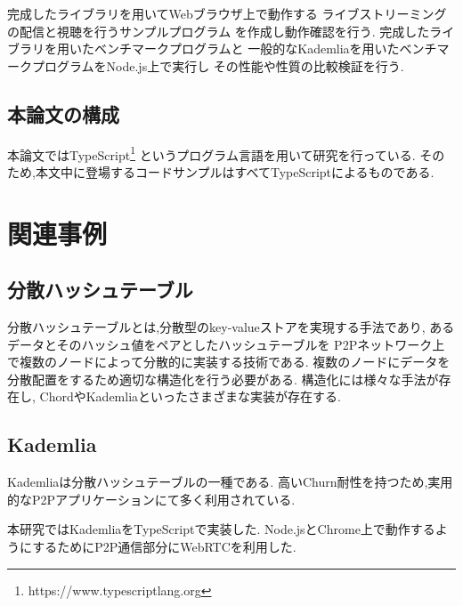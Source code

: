 \documentclass[sotsuron]{jcsie}
\begin{document}
完成したライブラリを用いてWebブラウザ上で動作する
ライブストリーミングの配信と視聴を行うサンプルプログラム
を作成し動作確認を行う.
完成したライブラリを用いたベンチマークプログラムと
一般的なKademliaを用いたベンチマークプログラムをNode.js上で実行し
その性能や性質の比較検証を行う.

\section{本論文の構成}
本論文ではTypeScript\footnote{https://www.typescriptlang.org}
というプログラム言語を用いて研究を行っている.
そのため,本文中に登場するコードサンプルはすべてTypeScriptによるものである.


\chapter{関連事例}
\section{分散ハッシュテーブル}
分散ハッシュテーブルとは,分散型のkey-valueストアを実現する手法であり,
あるデータとそのハッシュ値をペアとしたハッシュテーブルを
P2Pネットワーク上で複数のノードによって分散的に実装する技術である.
複数のノードにデータを分散配置をするため適切な構造化を行う必要がある.
構造化には様々な手法が存在し,
ChordやKademliaといったさまざまな実装が存在する.

\section{Kademlia}
Kademliaは分散ハッシュテーブルの一種である.
高いChurn耐性を持つため,実用的なP2Pアプリケーションにて多く利用されている.

本研究ではKademliaをTypeScriptで実装した.
Node.jsとChrome上で動作するようにするためにP2P通信部分にWebRTCを利用した.
\end{document}
